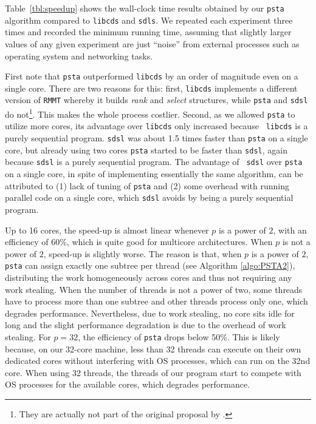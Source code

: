 Table~\ref{tbl:speedup} shows the wall-clock time results obtained by
our {\tt psta} algorithm compared to \verb+libcds+ and \verb+sdls+.
We repeated each experiment three times and recorded the minimum
running time, assuming that slightly larger values of any given
experiment are just ``noise'' from external processes such as
operating system and networking tasks.


First note that {\tt psta} outperformed {\tt libcds} by an order of
magnitude even on a single core. There are two reasons for this:
first, \verb+libcds+ implements a different version of \verb+RMMT+
whereby it builds {\em rank} and {\em select} structures, while
\verb+psta+ and \verb+sdsl+ do not\footnote{They are actually not part
  of the original proposal by
  \cite{Navarro:2014:FFS:2620785.2601073}.}. This makes the whole
process costlier. Second, as we allowed {\tt psta} to utilize more
cores, its advantage over {\tt libcds} only increased because {\tt
  libcds} is a purely sequential program.  {\tt sdsl} was about 1.5
times faster than {\tt psta} on a single core, but already using two
cores {\tt psta} started to be faster than {\tt sdsl}, again because
{\tt sdsl} is a purely sequential program.  The advantage of {\tt
  sdsl} over {\tt psta} on a single core, in spite of implementing
essentially the same algorithm, can be attributed to (1) lack of
tuning of {\tt psta} and (2) some overhead with running parallel code
on a single core, which {\tt sdsl} avoids by being a purely sequential
program.

Up to 16 cores, the speed-up is almost linear whenever $p$ is a power
of $2$, with an efficiency of 60\%, which is quite good for multicore
architectures.  When $p$ is not a power of $2$, speed-up is slightly
worse.  The reason is that, when $p$ is a power of $2$, {\tt psta} can
assign exactly one subtree per thread (see Algorithm
\ref{algo:PSTA2}), distributing the work homogeneously across cores
and thus not requiring any work stealing.  When the number of threads
is not a power of two, some threads have to process more than one
subtree and other threads process only one, which degrades
performance.  Nevertheless, due to work stealing, no core sits idle
for long and the slight performance degradation is due to the overhead
of work stealing.  For $p = 32$, the efficiency of {\tt psta} drops
below 50\%.  This is likely because, on our 32-core machine, less than
32 threads can execute on their own dedicated cores without
interfering with OS processes, which can run on the 32nd core.  When
using 32 threads, the threads of our program start to compete with OS
processes for the available cores, which degrades performance.

